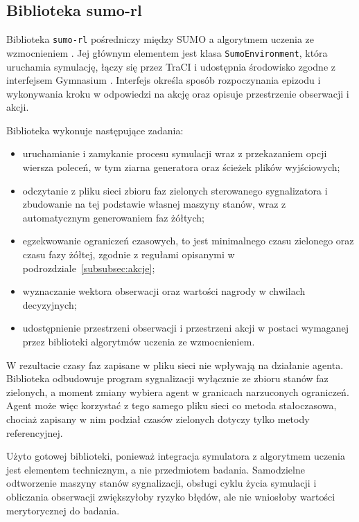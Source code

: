 \subsection{Biblioteka sumo-rl}
\label{subsec:sumo-rl}

Biblioteka \texttt{sumo-rl} pośredniczy między SUMO a algorytmem uczenia ze wzmocnieniem \cite{alegre2019sumorl}. Jej głównym elementem jest klasa \texttt{SumoEnvironment}, która uruchamia symulację, łączy się przez TraCI i udostępnia środowisko zgodne z interfejsem Gymnasium \cite{towers2025gymnasium}. Interfejs określa sposób rozpoczynania epizodu i wykonywania kroku w odpowiedzi na akcję oraz opisuje przestrzenie obserwacji i akcji.

Biblioteka wykonuje następujące zadania:
\begin{itemize}
    \item uruchamianie i zamykanie procesu symulacji wraz z przekazaniem opcji wiersza poleceń, w tym ziarna generatora oraz ścieżek plików wyjściowych;
    \item odczytanie z pliku sieci zbioru faz zielonych sterowanego sygnalizatora i zbudowanie na tej podstawie własnej maszyny stanów, wraz z automatycznym generowaniem faz żółtych;
    \item egzekwowanie ograniczeń czasowych, to jest minimalnego czasu zielonego oraz czasu fazy żółtej, zgodnie z regułami opisanymi w podrozdziale~\ref{subsubsec:akcje};
    \item wyznaczanie wektora obserwacji oraz wartości nagrody w chwilach decyzyjnych;
    \item udostępnienie przestrzeni obserwacji i przestrzeni akcji w postaci wymaganej przez biblioteki algorytmów uczenia ze wzmocnieniem.
\end{itemize}

W rezultacie czasy faz zapisane w pliku sieci nie wpływają na działanie agenta. Biblioteka odbudowuje program sygnalizacji wyłącznie ze zbioru stanów faz zielonych, a moment zmiany wybiera agent w granicach narzuconych ograniczeń. Agent może więc korzystać z tego samego pliku sieci co metoda stałoczasowa, chociaż zapisany w nim podział czasów zielonych dotyczy tylko metody referencyjnej.

Użyto gotowej biblioteki, ponieważ integracja symulatora z algorytmem uczenia jest elementem technicznym, a nie przedmiotem badania. Samodzielne odtworzenie maszyny stanów sygnalizacji, obsługi cyklu życia symulacji i obliczania obserwacji zwiększyłoby ryzyko błędów, ale nie wniosłoby wartości merytorycznej do badania.

